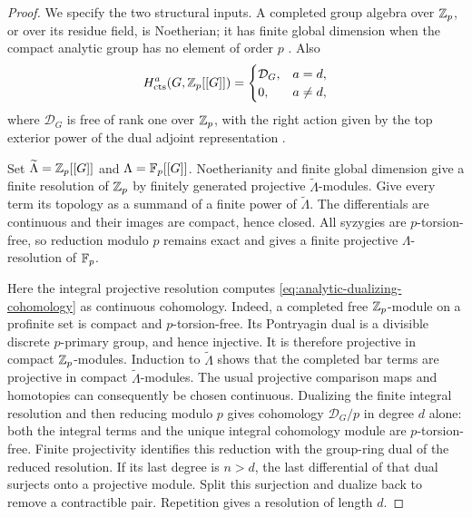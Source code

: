\begin{proof}
We specify the two structural inputs.  A completed group algebra over
$\mathbb Z_p$, or over its residue field, is Noetherian; it has finite global
dimension when the compact analytic group has no element of order $p$
\cite[Section~3.3, Proposition~(d),(e)]{AW06}.  Also
\begin{equation}
 \label{eq:analytic-dualizing-cohomology}
 H^a_{\mathrm{cts}}(G,\mathbb Z_p[[G]])=
 \begin{cases}
  \mathcal D_G,&a=d,\\
  0,&a\ne d,
 \end{cases}
\end{equation}
where $\mathcal D_G$ is free of rank one over $\mathbb Z_p$, with the right
action given by the top exterior power of the dual adjoint
representation \cite[Proposition~4.16, Remark~4.23, and
Proposition~4.40]{BGHS22}.

Set $\widetilde\Lambda=\mathbb Z_p[[G]]$ and $\Lambda=\mathbb F_p[[G]]$.
Noetherianity and finite global dimension give a finite resolution of
$\mathbb Z_p$ by finitely generated projective $\widetilde\Lambda$-modules.
Give every term its topology as a summand of a finite power of
$\widetilde\Lambda$.  The differentials are continuous and their images
are compact, hence closed.  All syzygies are $p$-torsion-free, so
reduction modulo $p$ remains exact and gives a finite projective
$\Lambda$-resolution of $\mathbb F_p$.

Here the integral projective resolution computes
\eqref{eq:analytic-dualizing-cohomology} as continuous cohomology.
Indeed, a completed free $\mathbb Z_p$-module on a profinite set is compact and
$p$-torsion-free.  Its Pontryagin dual is a divisible discrete
$p$-primary group, and hence injective.  It is therefore projective in
compact $\mathbb Z_p$-modules.  Induction to $\widetilde\Lambda$ shows that the
completed bar terms are projective in compact
$\widetilde\Lambda$-modules.  The usual projective comparison maps and
homotopies can consequently be chosen continuous.  Dualizing the finite
integral resolution and then reducing modulo $p$ gives cohomology
$\mathcal D_G/p$ in degree $d$ alone: both the integral terms and the
unique integral cohomology module are $p$-torsion-free.  Finite
projectivity identifies this reduction with the group-ring dual of the
reduced resolution.  If its last degree is $n>d$, the last differential
of that dual surjects onto a projective module.  Split this surjection
and dualize back to remove a contractible pair.  Repetition gives a
resolution of length $d$.


\end{proof}
